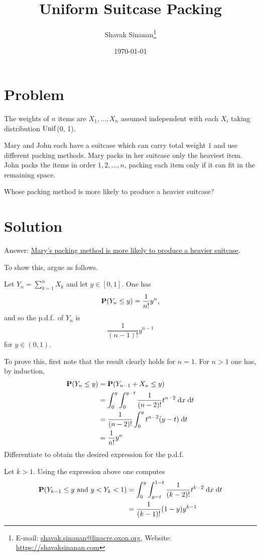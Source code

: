 \documentclass[british,a4paper]{article}
\title{Uniform Suitcase Packing}
\author{Shavak Sinanan\thanks{E-mail: \href{mailto:shavak.sinanan@linacre.oxon.org}{shavak.sinanan@linacre.oxon.org}, Website: \url{https://shavaksinanan.com}}}
\date{\today}
\begin{document}
\maketitle

\section*{Problem}
The weights of \(n\) items are \(X_1, \dotsc, X_n\) assumed independent with each \(X_i\) taking distribution \(\operatorname{Unif}\)(0, 1).

Mary and John each have a suitcase which can carry total weight \(1\) and use different packing methods. Mary packs in her suitcase only the heaviest item. John packs the items in order \(1, 2, \dotsc, n\), packing each item only if it can fit in the remaining space.

Whose packing method is more likely to produce a heavier suitcase?

\section*{Solution}

Answer: \underline{Mary's packing method is more likely to produce a heavier suitcase}.

To show this, argue as follows.

Let \(Y_n = \sum_{k = 1}^n X_k\) and let \(y \in [0, 1]\). One has
\[
\operatorname{\mathbf{P}}(Y_n \leq y) = \frac{1}{n!}y^n\text{,}
\]
and so the p.d.f.\ of \(Y_n\) is
\[
\frac{1}{(n - 1)!}y^{n - 1}
\]
for \(y \in (0, 1)\).

To prove this, first note that the result clearly holds for \(n = 1\). For \(n > 1\) one has, by induction,
\begin{equation*}
    \begin{split}
        \operatorname{\mathbf{P}}(Y_n \leq y) &= \operatorname{\mathbf{P}}(Y_{n - 1} + X_n \leq y)\\
        &= \int_0^y\int_0^{y - t} \frac{1}{(n - 2)!}t^{n - 2} \;\mathrm{d} x \;\mathrm{d} t\\
        &= \frac{1}{(n - 2)!} \int_0^y t^{n - 2}(y - t) \;\mathrm{d} t\\
        &= \frac{1}{n!}y^n
    \end{split}
\end{equation*}
Differentiate to obtain the desired expression for the p.d.f.

Let \(k > 1\). Using the expression above one computes
\begin{equation*}
    \begin{split}
        \operatorname{\mathbf{P}}(Y_{k - 1} \leq y \text{ and } y < Y_k < 1) &= \int_0^y \int_{y - t}^{1 - t} \frac{1}{(k - 2)!}t^{k - 2} \;\mathrm{d} x \;\mathrm{d} t\\
        &= \frac{1}{(k - 1)!}(1- y)y^{k - 1}
    \end{split}
\end{equation*}
\end{document}

